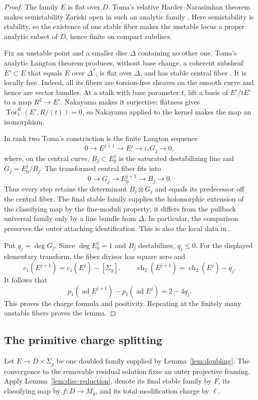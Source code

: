 \documentclass[11pt]{amsart}
\theoremstyle{definition}
\theoremstyle{remark}
\theoremstyle{plain}
\newcommand{\ad}{\operatorname{ad}}
\begin{document}
\begin{proof}
The family $E$ is flat over $D$.  Toma's relative
Harder--Narasimhan theorem makes semistability Zariski open in such an
analytic family \cite[Theorem~2.4]{Toma20}.  Here semistability is stability,
so the existence of one stable fiber makes the unstable locus a proper
analytic subset of $D$, hence finite on compact subdiscs.

Fix an unstable point and a smaller disc $\Delta$ containing no other one.
Toma's analytic Langton theorem produces, without base change, a coherent
subsheaf $E'\subset E$ that equals $E$ over $\Delta^*$, is flat over
$\Delta$, and has stable central fiber
\cite[Theorem~3.1]{Toma20}.  It is locally free.  Indeed, all its fibers are
torsion-free sheaves on the smooth curve and hence are vector bundles.  At a
stalk with base parameter $t$, lift a basis of $E'/tE'$ to a map
$R^2\to E'$.  Nakayama makes it surjective; flatness gives
$\operatorname{Tor}_1^R(E',R/(t))=0$, so Nakayama applied to the kernel
makes the map an isomorphism.

In rank two Toma's construction is the finite Langton sequence
\[
0\longrightarrow E^{j+1}\longrightarrow E^j
 \longrightarrow i_*G_j\longrightarrow0,
\]
where, on the central curve, $B_j\subset E^j_0$ is the saturated
destabilizing line and $G_j=E^j_0/B_j$.  The transformed central fiber fits
into
\[
0\longrightarrow G_j\longrightarrow E^{j+1}_0
 \longrightarrow B_j\longrightarrow0.
\]
Thus every step retains the determinant $B_j\otimes G_j$ and equals its
predecessor off the central fiber.  The final stable family supplies the
holomorphic extension of the classifying map by the fine-moduli property;
it differs from the pullback universal family only by a line bundle from
$\Delta$.  In particular, the comparison preserves the outer attaching
identification.  This is also the local data in
\cite[Proposition~5.2]{Owens01}.

Put $q_j=\deg G_j$.  Since $\deg E^j_0=1$ and $B_j$ destabilizes,
$q_j\leq0$.  For the displayed elementary transform, the fiber divisor has
square zero and
\[
 c_1(E^{j+1})=c_1(E^j)-[\Sigma_g],\qquad
 \operatorname{ch}_2(E^{j+1})=\operatorname{ch}_2(E^j)-q_j.
\]
It follows that
\[
p_1(\ad E^{j+1})-p_1(\ad E^j)=2-4q_j.
\]
This proves the charge formula and positivity.  Repeating at the finitely
many unstable fibers proves the lemma.
\end{proof}

\subsection{The primitive charge splitting}\label{sec:charge-splitting}
Let $E\to D\times\Sigma_g$ be one doubled family supplied by
Lemma~\ref{lem:doubling}.  The convergence to the removable residual
solution fixes an outer projective framing.  Apply
Lemma~\ref{lem:disc-reduction}, denote its final stable family by $F$, its
classifying map by $f:D\to M_g$, and its total modification charge by
$\ell$.
\end{document}
